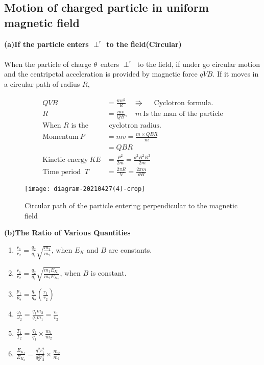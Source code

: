\subsection{Motion of charged particle in uniform magnetic field}
\textbf{(a)}\quad \textbf{If the particle enters $\perp^r$ to the field\quad(Circular)}\\\\
When the particle of charge $\theta$\ enters $\perp^r$\ to the field, if under go circular motion and the centripetal acceleration is provided by magnetic force $qVB$. If it moves in a circular path of radius $R$,\\
\begin{minipage}{0.65\textwidth}
	\begin{align*}
	QVB&=\frac{mv^2}{R}\quad \Rrightarrow\quad\text{ Cyclotron formula.}\\
	R&=\frac{mv}{QB},\quad m \ \text{Is the man of the particle}\\
	\text{When $R$ is the}&\text{ cyclotron radius.}\\
	\text{Momentum}\ P&=mv=\frac{m\times QBR}{m}\\
	&=QBR\\
	\text{Kinetic energy}\ KE&=\frac{P^2}{2m}=\frac{\theta^2B^2R^2}{2m}\\
	\text{Time period }\ T&=\frac{2\pi R}{V}=\frac{2\pi m}{\theta B}
	\end{align*}
\end{minipage}
	\begin{minipage}{0.35\textwidth}
	\begin{figure}[H]
		\centering
		\texttt{[image: diagram-20210427(4)-crop]}
		\caption{Circular path of the particle entering perpendicular to the magnetic field}
		\label{Cyclotron}
	\end{figure}				
\end{minipage}
\textbf{(b)}\quad \textbf{The Ratio of Various Quantities}\\
\begin{enumerate}
	\item $\frac{r_1}{r_{2}}=\frac{q_{2}}{q_{1}} \sqrt{\frac{m_{1}}{m_{2}}}$, when $E_{K}$ and $B$ are constants.
\item $\frac{r_{1}}{r_{2}}=\frac{q_{2}}{q_{1}} \sqrt{\frac{m_{1} E_{K_{1}}}{m_{2} E_{K_{2}}}}$, when $B$ is constant.
\item  $\frac{p_{1}}{p_{2}}=\frac{q_{1}}{q_{2}}\left(\frac{r_{1}}{r_{2}}\right)$
\item $\frac{\omega_{1}}{\omega_{2}}=\frac{q_{1} m_{2}}{q_{2} m_{1}}=\frac{v_{1}}{v_{2}}$
\item $\frac{T_{1}}{T_{2}}=\frac{q_{2}}{q_{1}} \times \frac{m_{1}}{m_{2}}$\\
\item  $\frac{E_{K_{l}}}{E_{K_{2}}}=\frac{q_{1}^{2} r_{1}^{2}}{q_{2}^{2} r_{2}^{2}} \times \frac{m_{2}}{m_{1}}$
\end{enumerate}
